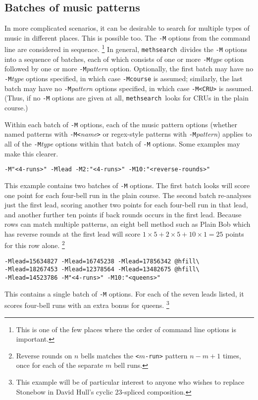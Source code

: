 \documentclass[a4paper,11pt,oneside]{book}
\def\methsearch{\texttt{meth\-search}}
\begin{document}
\subsection{Batches of music patterns}

In more complicated scenarios, it can be desirable to search for 
multiple types of music in different places.  This is possible too.
The \verb+-M+ options from the command line are considered in sequence.%
\footnote{This is one of the few places where the order of command line 
options is important.}
In general, \methsearch\ divides the \verb+-M+ options into a sequence of 
batches, each of which consists of one or more \verb+-M+\textit{type} option 
followed by one or more \verb+-M+\textit{pattern} option.  
Optionally, the first batch may have no \verb+-M+\textit{type} options 
specified, in which case \verb+-Mcourse+ is assumed;
similarly, the last batch may have no \verb+-M+\textit{pattern} options
specified, in which case \verb+-M<CRU>+ is assumed.  (Thus, if no \verb+-M+
options are given at all, \methsearch\ looks for CRUs in the plain course.)

Within each batch of \verb+-M+ options, each of the music pattern options
(whether named patterns with \verb+-M<+\textit{name}\verb+>+ or 
regex-style patterns with \verb+-M+\textit{pattern}) 
applies to all of the \verb+-M+\textit{type} options within that 
batch of \verb+-M+ options.  Some examples may make this clearer.

\begin{Verbatim}
-M"<4-runs>" -Mlead -M2:"<4-runs>" -M10:"<reverse-rounds>"
\end{Verbatim}
This example contains two batches of \verb+-M+ options.  The first batch
looks will score one point for each four-bell run in the plain course.
The second batch re-analyses just the first lead, scoring another two points 
for each four-bell run in that lead, and another further ten points if back 
rounds occurs in the first lead.  
Because rows can match multiple patterns, an eight bell method such as
Plain Bob which has reverse rounds at the first lead will score 
$\textrm{1}\times\textrm{5} + \textrm{2}\times\textrm{5} 
  + \textrm{10}\times\textrm{1} = \textrm{25}$ points for this row alone.%
\footnote{Reverse rounds on $n$ bells matches the \texttt{<$m$-run>} pattern 
$n-m+1$ times, once for each of the separate $m$ bell runs.}

\begin{Verbatim}[commandchars=@~~]
-Mlead=15634827 -Mlead=16745238 -Mlead=17856342 @hfill\
-Mlead=18267453 -Mlead=12378564 -Mlead=13482675 @hfill\
-Mlead=14523786 -M"<4-runs>" -M10:"<queens>"
\end{Verbatim}
This contains a single batch of \verb+-M+ options.  For each of the seven 
leads listed, it scores four-bell runs with an extra bonus for queens.%
\footnote{This example will be of particular interest to anyone
who wishes to replace Stonebow\index{Stonebow, replacing} in David Hull's
cyclic 23-spliced composition.\index{Hull, David!23 spliced}}
\end{document}

